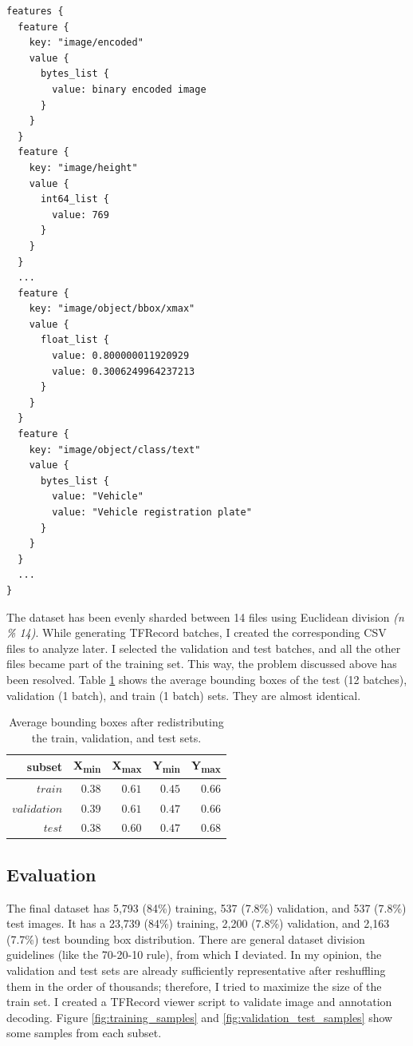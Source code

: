 \begin{lstlisting}
features {
  feature {
    key: "image/encoded"
    value {
      bytes_list {
        value: binary encoded image
      }
    }
  }
  feature {
    key: "image/height"
    value {
      int64_list {
        value: 769
      }
    }
  }
  ...
  feature {
    key: "image/object/bbox/xmax"
    value {
      float_list {
        value: 0.800000011920929
        value: 0.3006249964237213
      }
    }
  }
  feature {
    key: "image/object/class/text"
    value {
      bytes_list {
        value: "Vehicle"
        value: "Vehicle registration plate"
      }
    }
  }
  ...
}
\end{lstlisting}

The dataset has been evenly sharded between 14 files using Euclidean division \textit{(n \% 14)}. While generating TFRecord batches, I created the corresponding CSV files to analyze later. I selected the validation and test batches, and all the other files became part of the training set. This way, the problem discussed above has been resolved. Table \ref{tab:avg_boxes_after_redistributing} shows the average bounding boxes of the test (12 batches), validation (1 batch), and train (1 batch) sets. They are almost identical.

\begin{table}[htb]
\caption{Average bounding boxes after redistributing the train, validation, and test sets.}
\label{tab:avg_boxes_after_redistributing}
\noindent
\centering
\begin{tabular*}
{\columnwidth}{@{\extracolsep{\stretch{1}}}*{5}{r}@{}}
    subset & X\textsubscript{min} & X\textsubscript{max} & Y\textsubscript{min} & Y\textsubscript{max}\\ \hline
    $train$ & $0.38$ & $0.61$ & $0.45$ & $0.66$ \\
    $validation$ & $0.39$ & $0.61$ & $0.47$ & $0.66$ \\
    $test$ & $0.38$ & $0.60$ & $0.47$ & $0.68$ \\
\end{tabular*}
\end{table}

\subsection{Evaluation}

The final dataset has 5,793 (84\%) training, 537 (7.8\%) validation, and 537 (7.8\%) test images. It has a 23,739 (84\%) training, 2,200 (7.8\%) validation, and 2,163 (7.7\%) test bounding box distribution. There are general dataset division guidelines (like the 70-20-10 rule), from which I deviated. In my opinion, the validation and test sets are already sufficiently representative after reshuffling them in the order of thousands; therefore, I tried to maximize the size of the train set. I created a TFRecord viewer script to validate image and annotation decoding. Figure \ref{fig:training_samples} and \ref{fig:validation_test_samples} show some samples from each subset.

